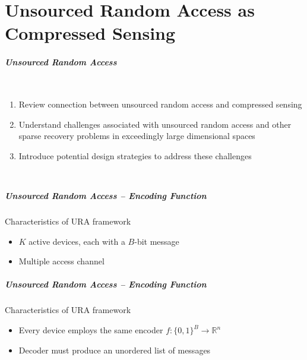 \part{Unsourced Random Access \newline as Compressed Sensing}
\frame{\partpage}


\begin{frame} \frametitle{Unsourced Random Access}
\hfill
\scalebox{0.5}{}
\vspace{-1cm}

\begin{columns}
\begin{enumerate}
  \item Review connection between unsourced random access and compressed sensing
  \item Understand challenges associated with unsourced random access and other sparse recovery problems in exceedingly large dimensional spaces
  \item Introduce potential design strategies to address these challenges
\end{enumerate}
\end{columns}
\vfill
\end{frame}


\begin{frame} \frametitle{Unsourced Random Access -- Encoding Function}
\begin{center}  \end{center}
\vfill
\begin{block}{Characteristics of URA framework}
\begin{itemize}
  \item $K$ active devices, each with a $B$-bit message
  \item Multiple access channel
\end{itemize}
\end{block}
\end{frame}


\begin{frame} \frametitle{Unsourced Random Access -- Encoding Function}
\begin{center}  \end{center}
\vfill
\begin{block}{Characteristics of URA framework}
\begin{itemize}
  \item Every device employs the same encoder $f: \{ 0, 1 \}^B \rightarrow \mathbb{R}^n$
  \item Decoder must produce an unordered list of messages
\end{itemize}
\end{block}
\end{frame}

